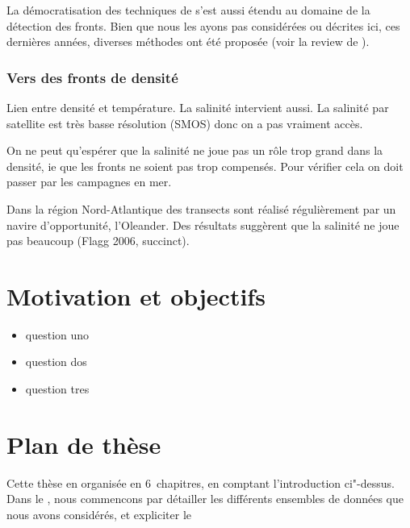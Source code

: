 \begin{note}
  La démocratisation des techniques de  s'est aussi étendu au domaine de la détection des fronts.
  Bien que nous les ayons pas considérées ou décrites ici, ces dernières années, diverses méthodes ont été proposée (voir la review de \cite{liu_2022}).
\end{note}

\subsubsection{Vers des fronts de densité}

Lien entre densité et température.
La salinité intervient aussi. La salinité par satellite est très basse résolution (SMOS) donc on a pas vraiment accès.

On ne peut qu'espérer que la salinité ne joue pas un rôle trop grand dans la densité, ie que les fronts ne soient pas trop compensés.
Pour vérifier cela on doit passer par les campagnes en mer.

Dans la région Nord-Atlantique des transects sont réalisé régulièrement par un navire d'opportunité, l'Oleander.
Des résultats suggèrent que la salinité ne joue pas beaucoup (Flagg 2006, succinct).

\section{Motivation et objectifs}
\label{sec:problematique}

\begingroup
{}
\begin{itemize}
        \setlength{\topsep}{\baselineskip}
        \setlength{\itemsep}{\baselineskip}
        \renewcommand*\labelitemi{\adfrightarrowhead}
  \item question uno
  \item question dos
  \item question tres
\end{itemize}
\endgroup

\section{Plan de thèse}
\label{sec:plan-de-these}

Cette thèse en organisée en 6~chapitres, en comptant l'introduction ci"-dessus.
Dans le , nous commencons par détailler les différents ensembles de données que nous avons considérés, et expliciter le
